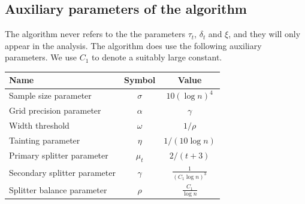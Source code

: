 \documentclass{acmsmall}
\newcommand{\err}{\xi}
\newcommand{\taint}{\eta}
\newcommand{\gridprec}{\alpha}
\newcommand{\ssz}{\sigma}
\begin{document}

\iffalse
\subsection{Auxiliary parameters of the algorithm}
\label{subsec:parameters}

The algorithm never refers to the the parameters $\tau_t$, $\delta_t$ and $\err$, and they will only appear in the analysis.
The algorithm does use the following auxiliary parameters. We use $C_1$ to denote a suitably large constant.

\begin{center}
  \begin{tabular}{ | l || c | c |}
    \hline
    {\bf Name} & {\bf Symbol} & {\bf Value} \\ \hline
    Sample size parameter & $\ssz$ & $10(\log n)^4$ \\ \hline
    Grid precision parameter & $\gridprec$ & $\gamma$ \\ \hline
    Width threshold & $\omega$ & $1/\rho$ \\ \hline 
    Tainting parameter & $\taint$ & $1/(10 \log n)$ \\ \hline
    Primary splitter parameter & $\mu_t$ & $2/(t+3)$ \\ \hline
    Secondary splitter parameter & $\gamma$ & $\frac{1}{(C_1\log n)^3}$ \\ \hline
    Splitter balance parameter & $\rho$ & $\frac{C_1}{\log n}$ \\ \hline
  \end{tabular}
\end{center}
%
%
\end{document}
